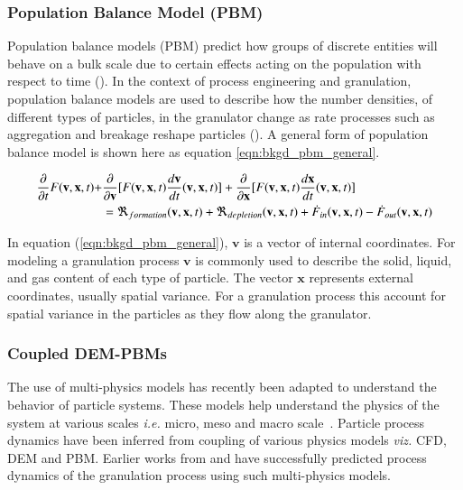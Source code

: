 \documentclass[preprint,11pt,authoryear]{elsarticle}
\begin{document}
\subsubsection{Population Balance Model (PBM)}
     Population balance models (PBM) predict how groups of discrete entities will behave on a 
    bulk scale due to certain effects acting on the population with respect to time 
    (\cite{ramkrishna2014}). In the context of process engineering and granulation, population 
    balance models are used to describe how the number densities, of different types of particles, in 
    the granulator change as rate processes such as aggregation and breakage reshape particles 
    (\cite{Barrasso2013}). A general form of population balance model is shown here as equation 
    \ref{eqn:bkgd_pbm_general}.
    
    \begin{align}
    \frac{ \partial}{\partial t}F(\textbf{v},\textbf{x},t) +& \frac{\partial}{\partial 
        \textbf{v}}[F(\textbf{v},\textbf{x},t)\frac{d\textbf{v}}{dt}(\textbf{v},\textbf{x},t)] + 
    \frac{\partial}{\partial \textbf{x}}[F(\textbf{v},\textbf{x},t)\frac{d\textbf{x}}{dt}(\textbf{v},\textbf{x},t)] 
    \notag\\
    &= 
    \Re_{formation}(\textbf{v},\textbf{x},t)+\Re_{depletion}(\textbf{v},\textbf{x},t)+\dot{F}_{in}(\textbf{v},
    \textbf{x},t)-\dot{F}_{out}(\textbf{v},\textbf{x},t)
    \label{eqn:bkgd_pbm_general} 
    \end{align}
    
In equation (\ref{eqn:bkgd_pbm_general}), $\textbf{v}$ is a vector of internal coordinates. For 
modeling a granulation process $\textbf{v}$ is commonly used to describe the solid, liquid, and gas 
content of each type of particle. The vector $\textbf{x}$ represents external coordinates, usually 
spatial variance. For a granulation process this  account for spatial variance in the particles as they 
flow along the granulator.

\subsubsection{Coupled DEM-PBMs}
The use of multi-physics models has recently been adapted to understand the behavior of 
particle systems. These models help understand the physics of the system at various scales 
\textit{i.e.} micro, meso and macro scale~\citep{sen2014}. Particle process dynamics have been 
inferred from coupling of various physics models \textit{viz.} CFD, 
DEM and PBM. Earlier works from \cite{sen2014} and \cite{Barrasso2015cerd} have successfully 
predicted process dynamics of the granulation process using such multi-physics models.
\end{document}
